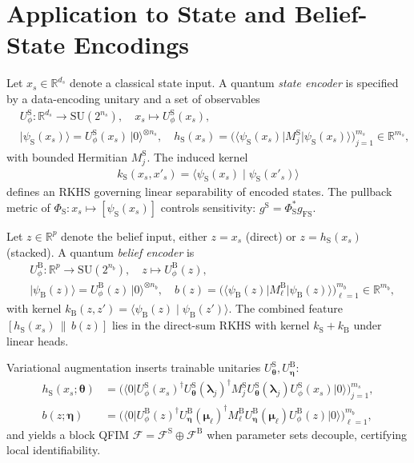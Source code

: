 \documentclass[11pt]{article}
\begin{document}
\section{Application to State and Belief-State Encodings}

Let \(x_s\in\mathbb{R}^{d_s}\) denote a classical state input. A quantum \emph{state encoder} is specified by a data-encoding unitary and a set of observables
\begin{align}
  &U^{\mathrm{S}}_\phi: \mathbb{R}^{d_s}\to \mathrm{SU}(2^{n_s}),\quad x_s\mapsto U^{\mathrm{S}}_\phi(x_s),\\
  &\lvert \psi_{\mathrm{S}}(x_s)\rangle = U^{\mathrm{S}}_\phi(x_s)\,\lvert 0\rangle^{\otimes n_s},\quad
  h_{\mathrm{S}}(x_s) = \big( \langle \psi_{\mathrm{S}}(x_s) \rvert M^{\mathrm{S}}_j \lvert \psi_{\mathrm{S}}(x_s) \rangle \big)_{j=1}^{m_s} \in \mathbb{R}^{m_s},
\end{align}
with bounded Hermitian \(M^{\mathrm{S}}_j\). The induced kernel
\begin{align}
  k_{\mathrm{S}}(x_s,x'_s)=\langle \psi_{\mathrm{S}}(x_s)\mid\psi_{\mathrm{S}}(x'_s)\rangle
\end{align}
defines an RKHS governing linear separability of encoded states. The pullback metric of \(\Phi_{\mathrm{S}}:x_s\mapsto[\psi_{\mathrm{S}}(x_s)]\) controls sensitivity: \(g^{\mathrm{S}} = \Phi_{\mathrm{S}}^* g_{\mathrm{FS}}\).

Let \(z\in\mathbb{R}^{p}\) denote the belief input, either \(z=x_s\) (direct) or \(z=h_{\mathrm{S}}(x_s)\) (stacked). A quantum \emph{belief encoder} is
\begin{align}
  &U^{\mathrm{B}}_\phi: \mathbb{R}^{p}\to \mathrm{SU}(2^{n_b}),\quad z\mapsto U^{\mathrm{B}}_\phi(z),\\
  &\lvert \psi_{\mathrm{B}}(z)\rangle = U^{\mathrm{B}}_\phi(z)\,\lvert 0\rangle^{\otimes n_b},\quad
  b(z) = \big( \langle \psi_{\mathrm{B}}(z) \rvert M^{\mathrm{B}}_\ell \lvert \psi_{\mathrm{B}}(z) \rangle \big)_{\ell=1}^{m_b} \in \mathbb{R}^{m_b},
\end{align}
with kernel \(k_{\mathrm{B}}(z,z')=\langle \psi_{\mathrm{B}}(z)\mid\psi_{\mathrm{B}}(z')\rangle\). The combined feature \([h_{\mathrm{S}}(x_s)\,\|\,b(z)]\) lies in the direct-sum RKHS with kernel \(k_{\mathrm{S}}+k_{\mathrm{B}}\) under linear heads.

Variational augmentation inserts trainable unitaries \(U^{\mathrm{S}}_{\bm{\theta}},U^{\mathrm{B}}_{\bm{\eta}}\):
\begin{align}
  h_{\mathrm{S}}(x_s;\bm{\theta}) &= \big( \langle 0 \rvert U^{\mathrm{S}}_\phi(x_s)^{\dagger} U^{\mathrm{S}}_{\bm{\theta}}(\bm{\lambda}_j)^{\dagger} M^{\mathrm{S}}_j U^{\mathrm{S}}_{\bm{\theta}}(\bm{\lambda}_j) U^{\mathrm{S}}_\phi(x_s) \lvert 0 \rangle \big)_{j=1}^{m_s},\\
  b(z;\bm{\eta}) &= \big( \langle 0 \rvert U^{\mathrm{B}}_\phi(z)^{\dagger} U^{\mathrm{B}}_{\bm{\eta}}(\bm{\mu}_\ell)^{\dagger} M^{\mathrm{B}}_\ell U^{\mathrm{B}}_{\bm{\eta}}(\bm{\mu}_\ell) U^{\mathrm{B}}_\phi(z) \lvert 0 \rangle \big)_{\ell=1}^{m_b},
\end{align}
and yields a block QFIM \(\mathcal{F}=\mathcal{F}^{\mathrm{S}}\oplus\mathcal{F}^{\mathrm{B}}\) when parameter sets decouple, certifying local identifiability.
\end{document}
